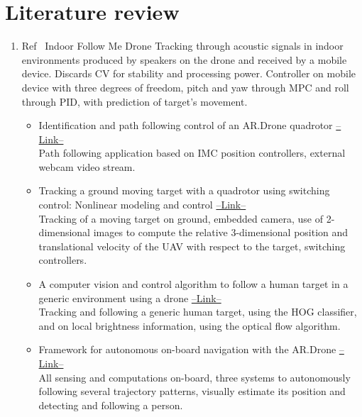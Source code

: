 \section{Literature review}
\begin{enumerate}

\item Ref~\cite{Mao2017345} Indoor Follow Me Drone
Tracking through acoustic signals in indoor environments produced by speakers on the drone and received by a mobile device. Discards CV for stability and processing power. Controller on mobile device with three degrees of freedom, pitch and yaw through MPC and roll through PID, with prediction of target's movement.
\begin{itemize}
\item Identification and path following control of an AR.Drone quadrotor \href{https://www.scopus.com/record/display.uri?eid=2-s2.0-84893212045&origin=reflist}{--Link--} \\ 
Path following application based on IMC position controllers, external webcam video stream.

\item Tracking a ground moving target with a quadrotor using switching control: Nonlinear modeling and control \href{https://www.scopus.com/record/display.uri?eid=2-s2.0-84871633622&origin=reflist}{--Link--} \\ 
Tracking of a moving target on ground, embedded camera, use of 2-dimensional images to compute the relative 3-dimensional position and translational velocity of the UAV with respect to the target, switching controllers.

\item A computer vision and control algorithm to follow a human target in a generic environment using a drone \href{https://www.scopus.com/record/display.uri?eid=2-s2.0-84978870802&origin=reflist}{--Link--} \\ 
Tracking and following a generic human target, using the HOG classifier, and on local brightness information, using the optical flow algorithm.

\item Framework for autonomous on-board navigation with the AR.Drone \href{https://www.scopus.com/record/display.uri?eid=2-s2.0-84899426060&origin=reflist}{--Link--} \\ 
All sensing and computations on-board, three systems to autonomously following several trajectory patterns, visually estimate its position and detecting and following a person.


\end{itemize}
\end{enumerate}
